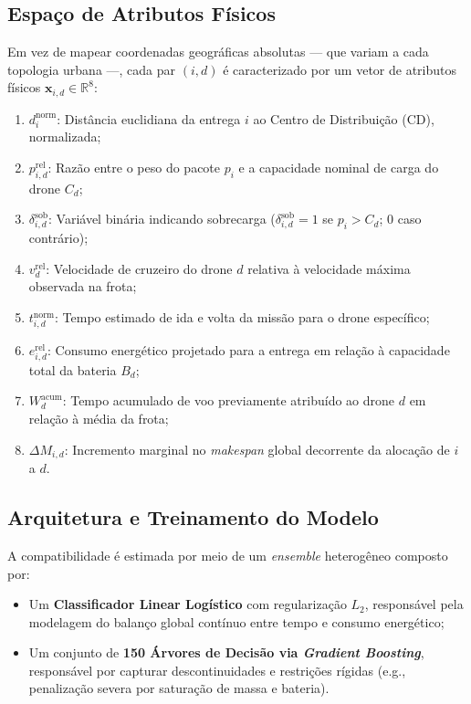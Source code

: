 \subsection{Espaço de Atributos Físicos}
Em vez de mapear coordenadas geográficas absolutas — que variam a cada topologia urbana —, cada par $(i, d)$ é caracterizado por um vetor de atributos físicos $\mathbf{x}_{i,d} \in \mathbb{R}^8$:

\begin{enumerate}
    \item $d^{\text{norm}}_{i}$: Distância euclidiana da entrega $i$ ao Centro de Distribuição (CD), normalizada;
    \item $p^{\text{rel}}_{i,d}$: Razão entre o peso do pacote $p_i$ e a capacidade nominal de carga do drone $C_d$;
    \item $\delta^{\text{sob}}_{i,d}$: Variável binária indicando sobrecarga ($\delta^{\text{sob}}_{i,d} = 1$ se $p_i > C_d$; $0$ caso contrário);
    \item $v^{\text{rel}}_{d}$: Velocidade de cruzeiro do drone $d$ relativa à velocidade máxima observada na frota;
    \item $t^{\text{norm}}_{i,d}$: Tempo estimado de ida e volta da missão para o drone específico;
    \item $e^{\text{rel}}_{i,d}$: Consumo energético projetado para a entrega em relação à capacidade total da bateria $B_d$;
    \item $W^{\text{acum}}_{d}$: Tempo acumulado de voo previamente atribuído ao drone $d$ em relação à média da frota;
    \item $\Delta M_{i,d}$: Incremento marginal no \textit{makespan} global decorrente da alocação de $i$ a $d$.
\end{enumerate}

\subsection{Arquitetura e Treinamento do Modelo}
A compatibilidade é estimada por meio de um \textit{ensemble} heterogêneo composto por:
\begin{itemize}
    \item Um \textbf{Classificador Linear Logístico} com regularização $L_2$, responsável pela modelagem do balanço global contínuo entre tempo e consumo energético;
    \item Um conjunto de \textbf{150 Árvores de Decisão via \textit{Gradient Boosting}}, responsável por capturar descontinuidades e restrições rígidas (e.g., penalização severa por saturação de massa e bateria).
\end{itemize}

